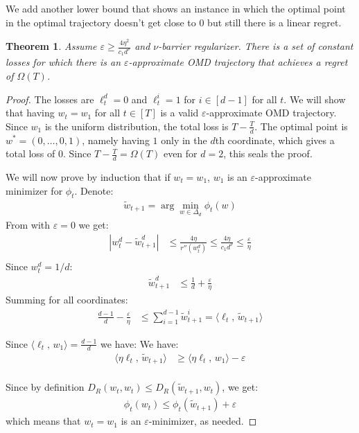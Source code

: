 \documentclass[10pt]{article}
\newtheorem{theorem}{Theorem}
\theoremstyle{definition}
\theoremstyle{remark}
\renewcommand{\epsilon}{\varepsilon}
\newcommand\inprod[2]{\langle #1,\,#2 \rangle}
\newcommand{\abs}[1]{ {\left | #1 \right |}}
\newcommand{\barconst}{\nu}
\begin{document}
We add another lower bound that shows an instance in which the optimal point in the  optimal trajectory doesn't get close to $0$ but still there is a linear regret.

\begin{theorem}\label{thm:dimension lower bound}
Assume $\epsilon \ge \frac{4\eta^2}{c_1d^\barconst}$ and $\barconst$-barrier regularizer. There is a set of constant losses for which there is an $\epsilon$-approximate OMD trajectory that achieves a regret of $\Omega(T)$.
\end{theorem}
\begin{proof}
The losses are $\ell_t^d = 0$ and $\ell_t^i = 1$ for $i\in[d-1]$ for all $t$. We will show that having $w_t=w_1$ for all $t\in[T]$ is a valid $\epsilon$-approximate OMD trajectory. Since $w_1$ is the uniform distribution, the total loss is $T-\frac{T}{d}$. The optimal point is $w^*=(0,\dots,0,1)$, namely having $1$ only in the $d$th coordinate, which gives a total loss of $0$. Since $T-\frac{T}{d}=\Omega(T)$ even for $d=2$, this seals the proof.

We will now prove by induction that if $w_t=w_1$, $w_1$ is an $\epsilon$-approximate minimizer for $\phi_t$. Denote:
\begin{align*}
    \tilde{w}_{t+1} = \arg\min_{w\in\Delta_d}\phi_t(w)
\end{align*}
From  with $\epsilon = 0$ we get:
\begin{align*}
    \abs{w_t^d-\tilde{w}_{t+1}^d} &\le \frac{4\eta}{r''(w_t^d)} \le \frac{4\eta}{c_1d^\barconst} \le \frac{\epsilon}{\eta} \\
\end{align*}
Since $w_t^d=1/d$:
\begin{align*}
    \tilde{w}_{t+1}^d &\le \frac{1}{d} + \frac{\epsilon}{\eta}
\end{align*}
Summing for all coordinates:
\begin{align*}
    \frac{d-1}{d} - \frac{\epsilon}{\eta} &\le \sum_{i=1}^{d-1}\tilde{w}_{t+1}^i =  \inprod{\ell_t}{\tilde{w}_{t+1}}
\end{align*}

Since $\inprod{\ell_t}{w_1} = \frac{d-1}{d}$ we have:
We have:
\begin{align*}
    \inprod{\eta\ell_t}{\tilde{w}_{t+1}} &\ge \inprod{\eta\ell_t}{w_1}  - \epsilon\\
\end{align*}

Since by definition $D_R(w_t,w_t) \le D_R(\tilde{w}_{t+1},w_t)$, we get:
\begin{align*}
    \phi_t(w_t) \le \phi_t(\tilde{w}_{t+1}) + \epsilon
\end{align*}
which means that $w_t=w_1$ is an $\epsilon$-minimizer, as needed.
\end{proof}
\end{document}
